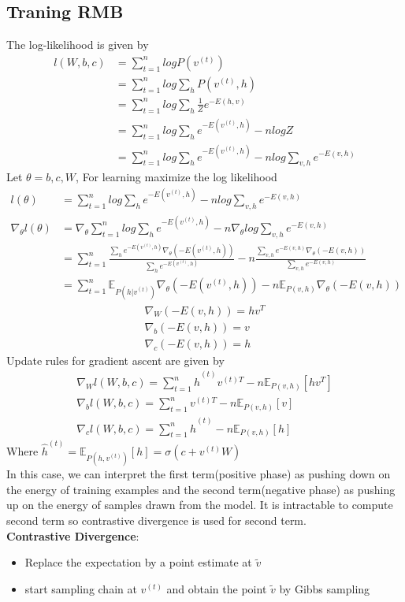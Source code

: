 \documentclass[letterpaper,10pt,english]{article}
\begin{document}
\subsection{Traning RMB}
The log-likelihood is given by
\begin{align}
l(W,b,c)&=\sum_{t=1}^n logP(v^{(t)})\\
&=\sum_{t=1}^n log\sum_hP(v^{(t)},h)\\
&= \sum_{t=1}^n log\sum_h \frac{1}{Z}e^{-E(h,v)}\\
&= \sum_{t=1}^n log\sum_h e^{-E(v^{(t)},h)}-nlogZ\\
&=\sum_{t=1}^n log\sum_h e^{-E(v^{(t)},h)}-nlog\sum_{v,h}e^{-E(v,h)}
\end{align}
Let $\theta={b,c,W}$, For learning maximize the log likelihood 
\begin{align}
l(\theta)&=\sum_{t=1}^n log\sum_h e^{-E(v^{(t)},h)}-nlog\sum_{v,h}e^{-E(v,h)}\\ 
\nabla_{\theta}l(\theta)&=\nabla_\theta \sum_{t=1}^n log\sum_h e^{-E(v^{(t)},h)}-n \nabla_\theta log\sum_{v,h}e^{-E(v,h)}\\
&=\sum_{t=1}^n \frac{\sum_h e^{-E(v^{(t)},h)}\nabla_\theta (-E(v^{(t)},h))}{\sum_h e^{-E(v^{(t)},h)}} -n\frac{\sum_{v,h}e^{-E(v,h)}\nabla_\theta (-E(v,h))}{\sum_{v,h} e^{-E(v,h)}}\\
&=\sum_{t=1}^n \mathbb{E}_{P(h|v^{(t)})}\nabla_\theta (-E(v^{(t)},h))- n\mathbb{E}_{P(v,h)}\nabla_\theta (-E(v,h))
\end{align}
\begin{align}
\nabla_W(-E(v,h))=hv^T\\
\nabla_b(-E(v,h))=v\\
\nabla_c(-E(v,h))=h
\end{align}
Update rules for gradient ascent are given by
\begin{align}
\nabla_Wl(W,b,c)=\sum_{t=1}^n \hat{h}^{(t)}v^{(t)T}-n \mathbb{E}_{P(v,h)}[hv^T]\\
\nabla_bl(W,b,c)=\sum_{t=1}^n v^{(t)T}-n \mathbb{E}_{P(v,h)}[v]\\
\nabla_cl(W,b,c)=\sum_{t=1}^n \hat{h}^{(t)}-n \mathbb{E}_{P(v,h)}[h]
\end{align}
Where $\hat{h}^{(t)}=\mathbb{E}_{P(h,v^{(t)})}[h]=\sigma(c+v^{(t)}W)$\\

In this case, we can interpret the first term(positive
phase) as pushing down on the energy of training examples and the second term(negative phase)
as pushing up on the energy of samples drawn from the model. It is intractable to compute second term so contrastive divergence is used for second term.\\
\textbf{Contrastive Divergence}:
\begin{itemize}
	\item Replace the expectation by a point estimate at $\tilde{v}$
	\item start sampling chain at $v^{(t)}$ and obtain the point $\tilde{v}$ by Gibbs sampling
\end{itemize}
\end{document}
